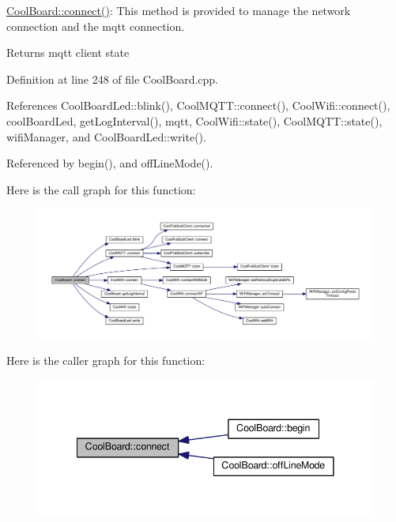 \hyperlink{class_cool_board_a519de78b807f8ec6463ff484eb925918}{Cool\+Board\+::connect()}\+: This method is provided to manage the network connection and the mqtt connection.

\begin{DoxyReturn}{Returns}
mqtt client state 
\end{DoxyReturn}


Definition at line 248 of file Cool\+Board.\+cpp.



References Cool\+Board\+Led\+::blink(), Cool\+M\+Q\+T\+T\+::connect(), Cool\+Wifi\+::connect(), cool\+Board\+Led, get\+Log\+Interval(), mqtt, Cool\+Wifi\+::state(), Cool\+M\+Q\+T\+T\+::state(), wifi\+Manager, and Cool\+Board\+Led\+::write().



Referenced by begin(), and off\+Line\+Mode().

Here is the call graph for this function\+:\nopagebreak
\begin{figure}[H]
\begin{center}
\leavevmode
\includegraphics[width=350pt]{d7/df9/class_cool_board_a519de78b807f8ec6463ff484eb925918_cgraph}
\end{center}
\end{figure}
Here is the caller graph for this function\+:\nopagebreak
\begin{figure}[H]
\begin{center}
\leavevmode
\includegraphics[width=341pt]{d7/df9/class_cool_board_a519de78b807f8ec6463ff484eb925918_icgraph}
\end{center}
\end{figure}
\mbox{\label{class_cool_board_ad7442cf4b62c7b0d5bd62a0f75ffc065}} 
